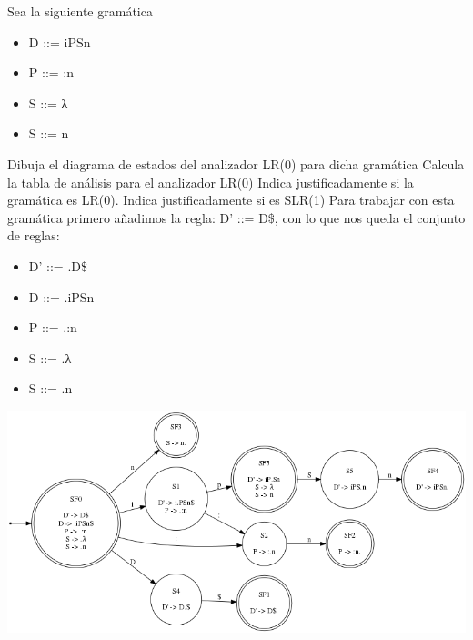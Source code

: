 \documentclass[nochap]{apuntes}
\begin{document}
\begin{problem}
Sea la siguiente gramática

\begin{itemize}
\item D ::= iPSn
\item P ::= :n
\item S ::= λ
\item S ::= n
\end{itemize}

\ppart Dibuja el diagrama de estados del analizador LR(0) para dicha gramática
\ppart Calcula la tabla de análisis para el analizador LR(0)
\ppart Indica justificadamente si la gramática es LR(0). Indica justificadamente si es SLR(1)
\solution
Para trabajar con esta gramática primero añadimos la regla: D' ::= D\$, con lo que nos queda el conjunto de reglas:
\begin{itemize}
\item D' ::= .D\$
\item D ::= .iPSn
\item P ::= .:n
\item S ::= .λ
\item S ::= .n
\end{itemize}
\ppart
\begin{center}
\includegraphics[scale=0.65]{automata_H3E4.png}
\end{center}


\end{problem}
\end{document}
